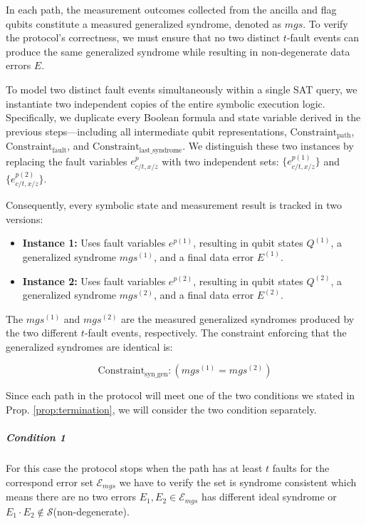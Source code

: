 \documentclass[acmsmallw,review]{acmart}
\begin{document}
 

In each path, the measurement outcomes collected from the ancilla and flag qubits constitute a measured generalized syndrome, denoted as $mgs$. To verify the protocol's correctness, we must ensure that no two distinct $t$-fault events can produce the same generalized syndrome while resulting in non-degenerate data errors $E$. 

To model two distinct fault events simultaneously within a single SAT query, we instantiate two independent copies of the entire symbolic execution logic. Specifically, we duplicate every Boolean formula and state variable derived in the previous steps—including all intermediate qubit representations, $\mathrm{Constraint}_{\mathrm{path}}$, $\mathrm{Constraint}_{\mathrm{fault}}$, and $\mathrm{Constraint}_{\mathrm{last\_syndrome}}$. We distinguish these two instances by replacing the fault variables $e^{p}_{c/t, x/z}$ with two independent sets: $\{e^{p(1)}_{c/t, x/z}\}$ and $\{e^{p(2)}_{c/t, x/z}\}$. 

Consequently, every symbolic state and measurement result is tracked in two versions:
\begin{itemize}
    \item \textbf{Instance 1:} Uses fault variables $e^{p(1)}$, resulting in qubit states $Q^{(1)}$, a generalized syndrome $mgs^{(1)}$, and a final data error $E^{(1)}$.
    \item \textbf{Instance 2:} Uses fault variables $e^{p(2)}$, resulting in qubit states $Q^{(2)}$, a generalized syndrome $mgs^{(2)}$, and a final data error $E^{(2)}$.
\end{itemize}


The  $mgs^{(1)}$ and $mgs^{(2)}$ are  the measured generalized syndromes produced by the two different $t$-fault events, respectively. The constraint enforcing that the generalized syndromes are identical is:

\begin{equation}
\mathrm{Constraint}_{\mathrm{syn\_gen}} : \left( mgs^{(1)} = mgs^{(2)} \right)
\end{equation}

Since each path in the protocol will meet one of the two conditions we stated in Prop. \ref{prop:termination}, we will consider the two condition separately.

\subparagraph{\textbf{Condition 1} }
For this case the protocol stops when the path has at least $t$ faults for the correspond error set $\mathcal{E}_{mgs}$ we have to verify the set is syndrome consistent which means there are no two errors $E_1 , E_2 \in \mathcal{E}_{mgs}$ has different ideal syndrome or $E_1 \cdot E_2 \notin \mathcal{S}$(non-degenerate).
\end{document}
